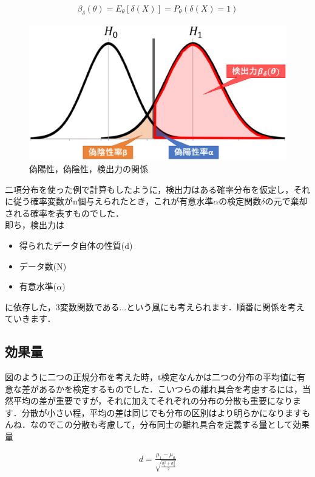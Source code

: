 \documentclass[11pt,a4paper]{ujreport} 	%
\begin{document}
\begin{align}
  \beta_\delta(\theta) = E_\theta[\delta(X)] = P_\theta(\delta(X)=1)
\end{align}

\begin{figure}[H]
  \includegraphics[width=15cm]{../figures/power-dist.eps}
  \caption{偽陽性，偽陰性，検出力の関係}
\end{figure}

二項分布を使った例で計算もしたように，検出力はある確率分布を仮定し，それに従う確率変数がn個与えられたとき，これが有意水準$\alpha$の検定関数$\delta$の元で棄却される確率を表すものでした．\\

即ち，検出力は
\begin{itemize}
  \item 得られたデータ自体の性質(d)
  \item データ数(N)
  \item 有意水準($\alpha$)
\end{itemize}

に依存した，3変数関数である...という風にも考えられます．順番に関係を考えていきます．\\

\subsection{効果量}
図のように二つの正規分布を考えた時，t検定なんかは二つの分布の平均値に有意な差があるかを検定するものでした．こいつらの離れ具合を考慮するには，当然平均の差が重要ですが，それに加えてそれぞれの分布の分散も重要になります．分散が小さい程，平均の差は同じでも分布の区別はより明らかになりますもんね．なのでこの分散も考慮して，分布同士の離れ具合を定義する量として効果量

\begin{align}
  d = \frac{\mu_1 - \mu_0}{\sqrt{\frac{\sigma_1^2+\sigma_0^2}{2}}}
\end{align}
\end{document}
